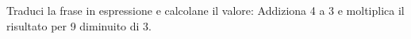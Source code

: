 \item Traduci la frase in espressione e calcolane il valore: Addiziona 4 a 3 e moltiplica il risultato per 9 diminuito di 3.